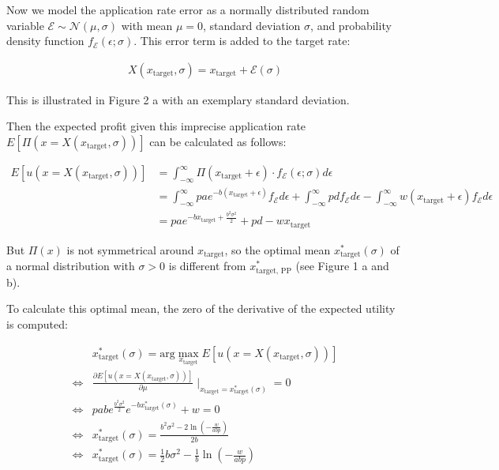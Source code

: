 Now we model the application rate error as a normally distributed random variable $\mathcal{E} \sim \mathcal{N}(\mu, \sigma)$ with mean $\mu=0$, standard deviation $\sigma$, and probability density function $f_\mathcal{E}(\epsilon; \sigma)$. This error term is added to the target rate:

\begin{align}
X(x_\text{target}, \sigma) = x_\text{target} + \mathcal{E}(\sigma)
\end{align}

This is illustrated in Figure 2 a with an exemplary standard deviation.

Then the expected profit given this imprecise application rate $E[\Pi(x=X(x_\text{target}, \sigma))]$ can be calculated as follows:

\begin{align}
E[u(x=X(x_\text{target}, \sigma))] &= \int_{-\infty}^\infty \Pi(x_\text{target} + \epsilon)\cdot f_\mathcal{E}(\epsilon; \sigma) d\epsilon\\
&= \int_{-\infty}^\infty p a e^{-b(x_\text{target} + \epsilon)} f_\mathcal{E} d\epsilon + \int_{-\infty}^\infty p d f_\mathcal{E} d\epsilon - \int_{-\infty}^\infty w(x_\text{target} + \epsilon) f_\mathcal{E} d\epsilon\\
&= p a e^{-b x_\text{target} + \frac{b^2\sigma^2}{2}} + pd - w x_\text{target}
\end{align}

But $\Pi(x)$ is not symmetrical around $x_\text{target}$, so the optimal mean $x^\ast_\text{target}(\sigma)$ of a normal distribution with $\sigma > 0$ is different from $x^\ast_\text{target, PP}$ (see Figure 1 a and b).

To calculate this optimal mean, the zero of the derivative of the expected utility is computed:

\begin{align}
&x^\ast_\text{target}(\sigma) = \text{arg}\max_{x_\text{target}} E[u(x=X(x_\text{target}, \sigma))] \\
\iff& \frac{\partial E[u(x=X(x_\text{target}, \sigma))]}{\partial \mu} \mid_{x_\text{target} = x^\ast_\text{target}(\sigma)} = 0 \\
\iff&  p a b e^{\frac{b^2 \sigma^2}{2}} e^{-b x^\ast_\text{target}(\sigma)} + w = 0 \\
\iff& x^\ast_\text{target}(\sigma) = \frac{b^2 \sigma^2 - 2 \ln\left(-\frac{w}{a b p}\right)}{2 b}\\
\iff& x^\ast_\text{target}(\sigma) = \frac{1}{2}b\sigma^2 - \frac{1}{b} \ln\left(-\frac{w}{a b p}\right)
\end{align}

